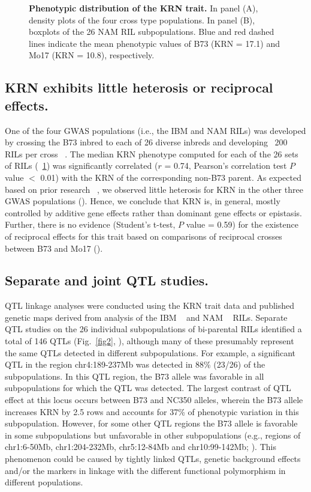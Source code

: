 \documentclass[10pt,letterpaper]{article}
\begin{document}
\begin{figure}[h]
\caption{{\bf Phenotypic distribution of the KRN trait.}
In panel (A), density plots of the four cross type populations. In panel (B), boxplots of the 26 NAM RIL subpopulations. Blue and red dashed lines indicate the mean phenotypic values of B73 (KRN = 17.1) and Mo17 (KRN = 10.8), respectively.}
\label{fig1}
\end{figure}

\subsection*{KRN exhibits little heterosis or reciprocal effects.}
One of the four GWAS populations (i.e., the IBM and NAM RILs) was developed by crossing the B73 inbred to each of 26 diverse inbreds and developing ~200 RILs per cross ~\cite{Lee2002, McMullen2009}. The median KRN phenotype computed for each of the 26 sets of RILs (~\ref{fig1}) was significantly correlated ($r$ = 0.74, Pearson’s correlation test $P$ value $<$ 0.01) with the KRN of the corresponding non-B73 parent. As expected based on prior research ~\cite{Srdic2007, Toledo2011}, we observed little heterosis for KRN in the other three GWAS populations (). Hence, we conclude that KRN is, in general, mostly controlled by additive gene effects rather than dominant gene effects or epistasis. Further, there is no evidence (Student’s t-test, $P$ value = 0.59) for the existence of reciprocal effects for this trait based on comparisons of reciprocal crosses between B73 and Mo17 ().

\subsection*{Separate and joint QTL studies.}

QTL linkage analyses were conducted using the KRN trait data and published genetic maps derived from analysis of the IBM ~\cite{Liu2010} and NAM ~\cite{Buckler2009} RILs. Separate QTL studies on the 26 individual subpopulations of bi-parental RILs identified a total of 146 QTLs (Fig.~\ref{fig2}, ), although many of these presumably represent the same QTLs detected in different subpopulations. For example, a significant QTL in the region chr4:189-237Mb was detected in 88\% (23/26) of the subpopulations. In this QTL region, the B73 allele was favorable in all subpopulations for which the QTL was detected. The largest contrast of QTL effect at this locus occurs between B73 and NC350 alleles, wherein the B73 allele increases KRN by 2.5 rows and accounts for 37\% of phenotypic variation in this subpopulation. However, for some other QTL regions the B73 allele is favorable in some subpopulations but unfavorable in other subpopulations (e.g., regions of chr1:6-50Mb, chr1:204-232Mb, chr5:12-84Mb and chr10:99-142Mb; ). This phenomenon could be caused by tightly linked QTLs, genetic background effects and/or the markers in linkage with the different functional polymorphism in different populations.
\end{document}
